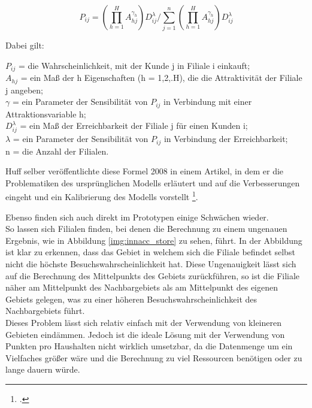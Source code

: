 \begin{equation}
	P_{i j}=\left(\prod_{h=1}^{H} A_{h j}^{\gamma_{h}}\right) D_{i j}^{\lambda} / \sum_{j=1}^{n}\left(\prod_{h=1}^{H} A_{h j}^{\gamma_{h}}\right) D_{i j}^{\lambda}
\end{equation}

Dabei gilt:

\( P_{i j} \) = die Wahrscheinlichkeit, mit der Kunde j in Filiale i einkauft;\\
\( A_{h j} \) = ein Maß der h Eigenschaften (h = 1,2,.H), die die Attraktivität der Filiale j angeben;\\
\( \gamma \) = ein Parameter der Sensibilität von \(P_{i j}\) in Verbindung mit einer Attraktionsvariable h;\\
\( D_{i j}^{\lambda} \) = ein Maß der Erreichbarkeit der Filiale j für einen Kunden i;\\
\( {\lambda} \) = ein Parameter der Sensibilität von \(P_{i j}\) in Verbindung der Erreichbarkeit;\\
n = die Anzahl der Filialen.

Huff selber veröffentlichte diese Formel 2008 in einem Artikel, in dem er die Problematiken des ursprünglichen Modells erläutert und auf die Verbesserungen eingeht und ein Kalibrierung des Modells vorstellt \footcite{huff_calibrating_2008}.

Ebenso finden sich auch direkt im Prototypen einige Schwächen wieder.\\
So lassen sich Filialen finden, bei denen die Berechnung zu einem ungenauen Ergebnis, wie in Abbildung \ref{img:innacc_store} zu sehen, führt.
In der Abbildung ist klar zu erkennen, dass das Gebiet in welchem sich die Filiale befindet selbst nicht die höchste Besuchswahrscheinlichkeit hat.
Diese Ungenauigkeit lässt sich auf die Berechnung des Mittelpunkts des Gebiets zurückführen, so ist die Filiale näher am Mittelpunkt des Nachbargebiets als am Mittelpunkt des eigenen Gebiets gelegen, was zu einer höheren Besuchswahrscheinlichkeit des Nachbargebiets führt.\\
Dieses Problem lässt sich relativ einfach mit der Verwendung von kleineren Gebieten eindämmen.
Jedoch ist die ideale Lösung mit der Verwendung von Punkten pro Haushalten nicht wirklich umsetzbar, da die Datenmenge um ein Vielfaches größer wäre und die Berechnung zu viel Ressourcen benötigen oder zu lange dauern würde.


